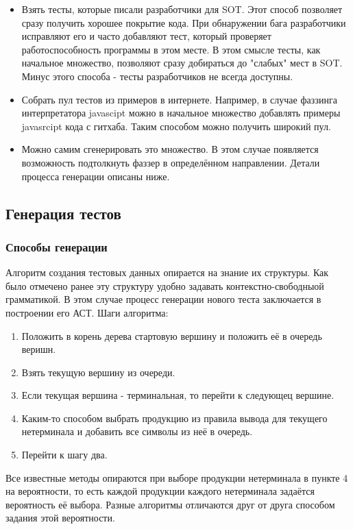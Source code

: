 \documentclass[a4paper]{article}
\begin{document}
\begin{itemize}
    \item Взять тесты, которые писали разработчики для SOT. Этот способ позволяет сразу получить хорошее покрытие кода. При обнаружении бага разработчики исправляют его и часто добавляют тест, который проверяет работоспособность программы в этом месте. В этом смысле тесты, как начальное множество, позволяют сразу добираться до "слабых" мест в SOT. Минус этого способа - тесты разработчиков не всегда доступны.
    \item Собрать пул тестов из примеров в интернете. Например, в случае фаззинга интерпретатора javascipt можно в начальное множество добавлять примеры javasrcipt кода с гитхаба. Таким способом можно получить широкий пул.
    \item Можно самим сгенерировать это множество. В этом случае появляется возможность подтолкнуть фаззер в определённом направлении. Детали процесса генерации описаны ниже.
\end{itemize}

\subsection{Генерация тестов}
\indent

\subsubsection{Способы генерации}
\indent

Алгоритм создания тестовых данных опирается на знание их структуры. Как было отмечено ранее эту структуру удобно задавать контекстно-свободныой грамматикой. В этом случае процесс генерации нового теста заключается в построении его АСТ. Шаги алгоритма:

\begin{enumerate}
    \item Положить в корень дерева стартовую вершину и положить её в очередь веришн.
    \item Взять текущую вершину из очереди.
    \item Если текущая вершина - терминальная, то перейти к следующец вершине.
    \item Каким-то способом выбрать продукцию из правила вывода для текущего нетерминала и добавить все символы из неё в очередь.
    \item Перейти к шагу два.
\end{enumerate}

Все известные методы опираются при выборе продукции нетерминала в пункте 4 на вероятности, то есть каждой продукции каждого нетерминала задаётся вероятность её выбора. Разные алгоритмы отличаются друг от друга способом задания этой вероятности. 
\end{document}
